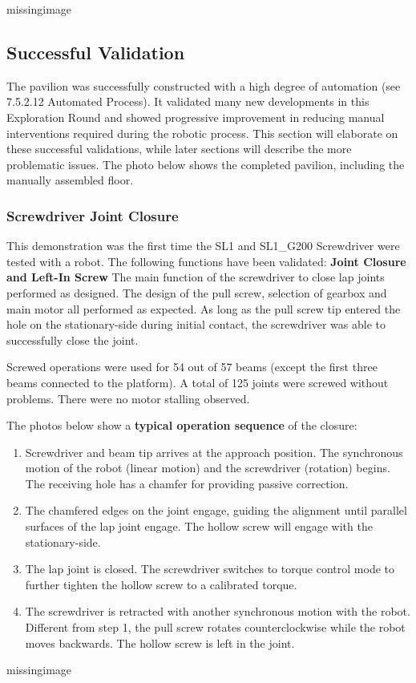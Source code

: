missingimage

\subsection{Successful Validation}
The pavilion was successfully constructed with a high degree of automation (see 7.5.2.12 Automated Process). It validated many new developments in this Exploration Round and showed progressive improvement in reducing manual interventions required during the robotic process. This section will elaborate on these successful validations, while later sections will describe the more problematic issues.
The photo below shows the completed pavilion, including the manually assembled floor.

\subsubsection{Screwdriver Joint Closure}
This demonstration was the first time the SL1 and SL1\_G200 Screwdriver were tested with a robot. The following functions have been validated:
\textbf{Joint Closure and Left-In Screw}
The main function of the screwdriver to close lap joints performed as designed. The design of the pull screw, selection of gearbox and main motor all performed as expected. As long as the pull screw tip entered the hole on the stationary-side during initial contact, the screwdriver was able to successfully close the joint. 

Screwed operations were used for 54 out of 57 beams (except the first three beams connected to the platform). A total of 125 joints were screwed without problems. There were no motor stalling observed.

The photos below show a \textbf{typical operation sequence }of the closure:
\begin{enumerate}
    \item Screwdriver and beam tip arrives at the approach position. The synchronous motion of the robot (linear motion) and the screwdriver (rotation) begins. The receiving hole has a chamfer for providing passive correction.
    \item The chamfered edges on the joint engage, guiding the alignment until parallel surfaces of the lap joint engage. The hollow screw will engage with the stationary-side.
    \item The lap joint is closed. The screwdriver switches to torque control mode to further tighten the hollow screw to a calibrated torque.
    \item The screwdriver is retracted with another synchronous motion with the robot. Different from step 1, the pull screw rotates counterclockwise while the robot moves backwards. The hollow screw is left in the joint.
\end{enumerate}
missingimage

